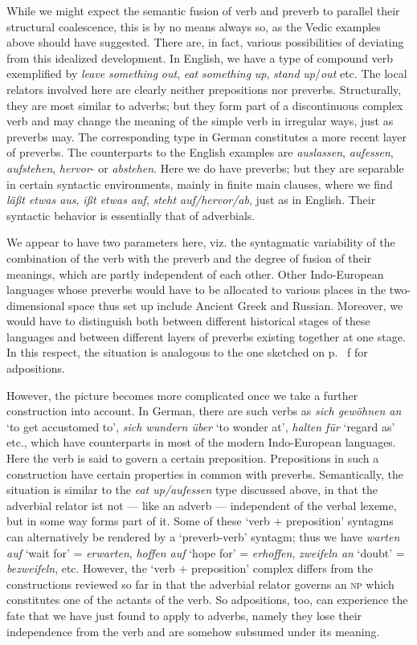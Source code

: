 While we might expect the semantic fusion of verb and preverb to parallel their structural coalescence, this is by no means always so, as the Vedic examples above should have suggested. There are, in fact, various possibilities of deviating from this idealized development. In English, we have a type of compound verb exemplified by \textit{leave} \textit{something} \textit{out}, \textit{eat} \textit{something} \textit{up}, \textit{stand} \textit{up}/\textit{out} etc. The local relators involved here are clearly neither prepositions nor preverbs. Structurally, they are most similar to adverbs; but they form part of a discontinuous complex verb and may change the meaning of the simple verb in irregular ways, just as preverbs may. The corresponding type in German constitutes a more recent layer of preverbs. The counterparts to the English examples are \textit{auslassen}, \textit{aufessen}, \textit{aufstehen}, \textit{hervor}{}- or \textit{abstehen}. Here we do have preverbs; but they are separable in certain syntactic environments, mainly in finite main clauses, where we find \textit{läßt etwas aus}, \textit{ißt etwas auf}, \textit{steht auf/hervor/ab}, just as in English. Their syntactic behavior is essentially that of adverbials.

We appear to have two parameters here, viz. the syntagmatic variability of the combination of the verb with the preverb and the degree of fusion of their meanings, which are partly independent of each other. Other Indo-European languages whose preverbs would have to be allocated to various places in the two-dimensional space thus set up include Ancient Greek and Russian. Moreover, we would have to distinguish both between different historical stages of these languages and between different layers of preverbs existing together at one stage. In this respect, the situation is analogous to the one sketched on p.~\pageref{page102}\chk%
f for adpositions.

However, the picture becomes more complicated once we take a further construction into account. In German, there are such verbs as \textit{sich gewöhnen an} ‘to get accustomed to’, \textit{sich wundern über} ‘to wonder at’, \textit{halten für} ‘regard as’ etc., which have counterparts in most of the modern Indo-European languages. Here the verb is said to govern a certain preposition. Prepositions in such a construction have certain properties in common with preverbs. Semantically, the situation is similar to the \textit{eat up/aufessen} type discussed above, in that the adverbial relator ist not — like an adverb — independent of the verbal lexeme, but in some way forms part of it. Some of these ‘verb + preposition’ syntagms can alternatively be rendered by a ‘preverb-verb’ syntagm; thus we have \textit{warten auf} ‘wait for’ = \textit{erwarten}, \textit{hoffen auf} ‘hope for’ = \textit{erhoffen}, \textit{zweifeln an} ‘doubt’ = \textit{bezweifeln}, etc. However, the ‘verb + preposition’ complex differs from the constructions reviewed so far in that the adverbial relator governs an \textsc{np} which constitutes one of the actants of the verb. So adpositions, too, can experience the fate that we have just found to apply to adverbs, namely they lose their independence from the verb and are somehow subsumed under its meaning.

